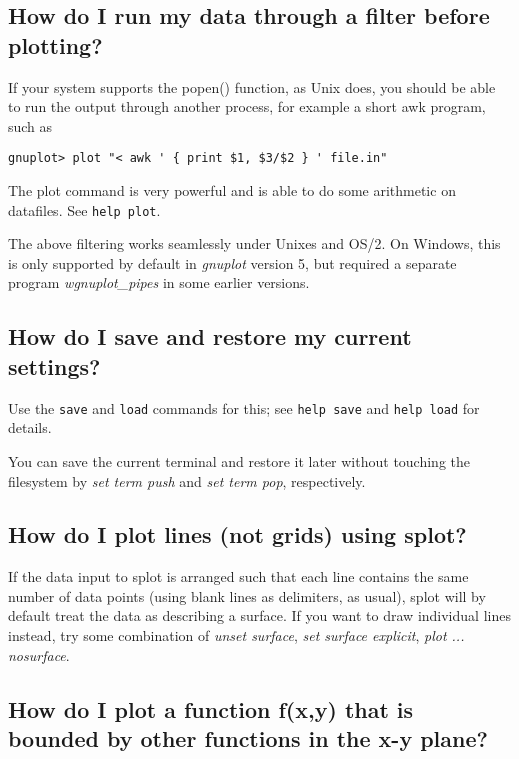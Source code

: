 \documentclass[a4paper,11pt]{article}
\begin{document}
\subsection{How do I run my data through a filter before plotting?}

If your system supports the popen() function, as Unix does, you
should be able to run the output through another process, for
example a short awk program, such as

\small
\begin{verbatim}
gnuplot> plot "< awk ' { print $1, $3/$2 } ' file.in"
\end{verbatim}
\normalsize

The plot command is very powerful and is able to do some
arithmetic on datafiles. See \verb+help plot+.

The above filtering works seamlessly under Unixes and OS/2. On Windows, this
is only supported by default in \textit{gnuplot} version 5, but required a 
separate program \textit{wgnuplot\_pipes} in some earlier versions.

\subsection{How do I save and restore my current settings?}

Use the \verb+save+ and \verb+load+ commands for this; see \verb+help save+
and \verb+help load+ for details.

You can save the current terminal and restore it later without touching the
filesystem by \textit{set term push} and \textit{set term pop}, respectively.


\subsection{How do I plot lines (not grids) using splot?}

If the data input to splot is arranged such that each line contains
the same number of data points (using blank lines as delimiters, as usual),
splot will by default treat the data as describing a surface.
If you want to draw individual lines instead, try some combination of
\textit{unset surface}, \textit{set surface explicit}, \textit{plot ... nosurface}.


\subsection{How do I plot a function f(x,y) that is bounded by other
          functions in the x-y plane?}
\end{document}
